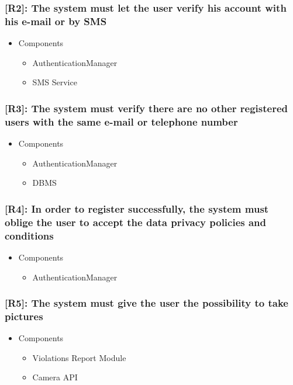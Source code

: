 \documentclass[12pt,a4paper]{article}
\begin{document}
\subsubsection*{[R2]: The system must let the user verify his account with his e-mail or by SMS}
\begin{itemize}
\item Components
\begin{itemize}
\item AuthenticationManager
\item SMS Service
\end{itemize}
\end{itemize}
\subsubsection*{[R3]: The system must verify there are no other registered users with the same e-mail or telephone number}
\begin{itemize}
\item Components
\begin{itemize}
\item AuthenticationManager
\item DBMS
\end{itemize}
\end{itemize}
\subsubsection*{[R4]: In order to register successfully, the system must oblige the user to accept the data privacy policies and conditions}
\begin{itemize}
\item Components
\begin{itemize}
\item AuthenticationManager
\end{itemize}
\end{itemize}
\subsubsection*{[R5]: The system must give the user the possibility to take pictures}
\begin{itemize}
\item Components
\begin{itemize}
\item Violations Report Module
\item Camera API
\end{itemize}
\end{itemize}
\end{document}
